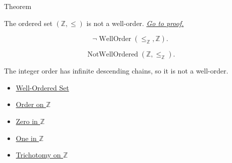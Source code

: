 \begin{theorembox}{Theorem}
\begin{theorem}
\label{thm:z-is-not-well-ordered}
The ordered set $(\mathbb{Z},\le)$ is not a well-order.
\hyperref[prf:z-is-not-well-ordered]{\textit{Go to proof.}}
\end{theorem}
\end{theorembox}

\begin{remark*}
\[
\neg\operatorname{WellOrder}(\le_{\mathbb{Z}},\mathbb{Z}).
\]
\end{remark*}

\begin{remark*}
\[
\operatorname{NotWellOrdered}(\mathbb{Z},\le_{\mathbb{Z}}).
\]
\end{remark*}

\begin{remark*}[Interpretation]
The integer order has infinite descending chains, so it is not a well-order.
\end{remark*}

\begin{dependencies}
\begin{itemize}
  \item \hyperref[def:well-ordered-set]{Well-Ordered Set}
  \item \hyperref[def:order-on-z]{Order on $\mathbb{Z}$}
  \item \hyperref[def:zero-in-z]{Zero in $\mathbb{Z}$}
  \item \hyperref[def:one-in-z]{One in $\mathbb{Z}$}
  \item \hyperref[thm:trichotomy-on-z]{Trichotomy on $\mathbb{Z}$}
\end{itemize}
\end{dependencies}

